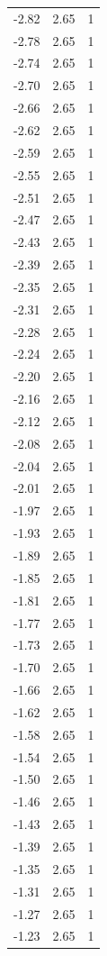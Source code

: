 \begin{longtable}{lrr}
  -2.82 & 2.65 & 1 \\
  -2.78 & 2.65 & 1 \\
  -2.74 & 2.65 & 1 \\
  -2.70 & 2.65 & 1 \\
  -2.66 & 2.65 & 1 \\
  -2.62 & 2.65 & 1 \\
  -2.59 & 2.65 & 1 \\
  -2.55 & 2.65 & 1 \\
  -2.51 & 2.65 & 1 \\
  -2.47 & 2.65 & 1 \\
  -2.43 & 2.65 & 1 \\
  -2.39 & 2.65 & 1 \\
  -2.35 & 2.65 & 1 \\
  -2.31 & 2.65 & 1 \\
  -2.28 & 2.65 & 1 \\
  -2.24 & 2.65 & 1 \\
  -2.20 & 2.65 & 1 \\
  -2.16 & 2.65 & 1 \\
  -2.12 & 2.65 & 1 \\
  -2.08 & 2.65 & 1 \\
  -2.04 & 2.65 & 1 \\
  -2.01 & 2.65 & 1 \\
  -1.97 & 2.65 & 1 \\
  -1.93 & 2.65 & 1 \\
  -1.89 & 2.65 & 1 \\
  -1.85 & 2.65 & 1 \\
  -1.81 & 2.65 & 1 \\
  -1.77 & 2.65 & 1 \\
  -1.73 & 2.65 & 1 \\
  -1.70 & 2.65 & 1 \\
  -1.66 & 2.65 & 1 \\
  -1.62 & 2.65 & 1 \\
  -1.58 & 2.65 & 1 \\
  -1.54 & 2.65 & 1 \\
  -1.50 & 2.65 & 1 \\
  -1.46 & 2.65 & 1 \\
  -1.43 & 2.65 & 1 \\
  -1.39 & 2.65 & 1 \\
  -1.35 & 2.65 & 1 \\
  -1.31 & 2.65 & 1 \\
  -1.27 & 2.65 & 1 \\
  -1.23 & 2.65 & 1 \\

\end{longtable}
